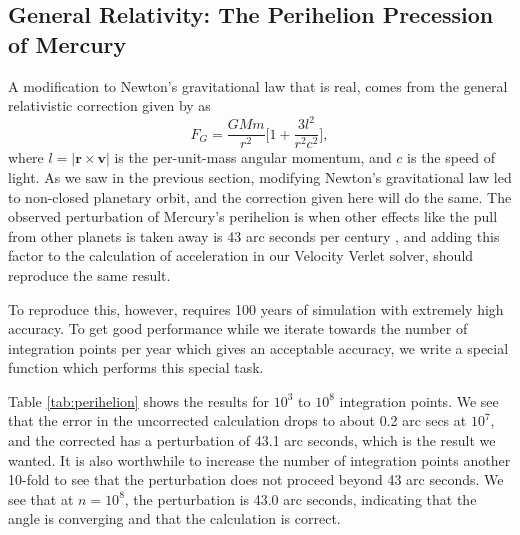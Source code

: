 \documentclass[]{article}
\begin{document}
\subsection{General Relativity: The Perihelion Precession of Mercury}
A modification to Newton's gravitational law that is real, comes from the general relativistic correction given by \cite{fys4150-p3} as
\begin{equation} \label{newton-rel}
	F_G = \frac{GMm}{r^2} \bigg[1 + \frac{3l^2}{r^2c^2}\bigg],
\end{equation}
where $l = |\mathbf{r} \times \mathbf{v}|$ is the per-unit-mass angular momentum, and $c$ is the speed of light. As we saw in the previous section, modifying Newton's gravitational law led to non-closed planetary orbit, and the correction given here will do the same. The observed perturbation of Mercury's perihelion is when other effects like the pull from other planets is taken away is 43 arc seconds per century \cite{fys4150-p3}, and adding this factor to the calculation of acceleration in our Velocity Verlet solver, should reproduce the same result.

To reproduce this, however, requires 100 years of simulation with extremely high accuracy. To get good performance while we iterate towards the number of integration points per year which gives an acceptable accuracy, we write a special function which performs this special task.

Table \ref{tab:perihelion} shows the results for $10^3$ to $10^8$ integration points. We see that the error in the uncorrected calculation drops to about 0.2 arc secs at $10^7$, and the corrected has a perturbation of 43.1 arc seconds, which is the result we wanted. It is also worthwhile to increase the number of integration points another 10-fold to see that the perturbation does not proceed beyond 43 arc seconds. We see that at $n=10^8$, the perturbation is 43.0 arc seconds, indicating that the angle is converging and that the calculation is correct.
\end{document}
